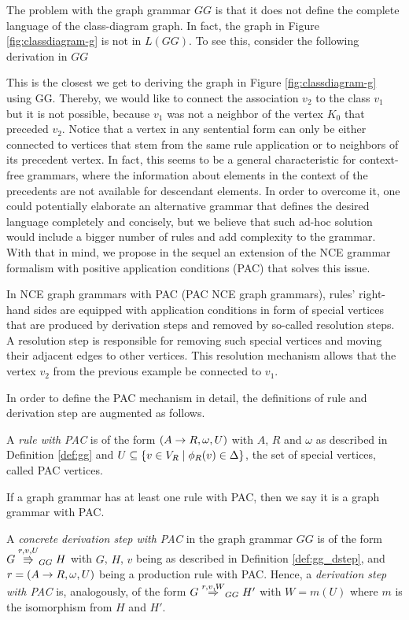 The problem with the graph grammar $GG$ is that it does not define the complete language of the class-diagram graph. In fact, the graph in Figure \ref{fig:classdiagram-g} is not in $L(GG)$. To see this, consider the following derivation in $GG$
%


This is the closest we get to deriving the graph in Figure \ref{fig:classdiagram-g} using GG. Thereby, we would like to connect the association $v_2$ to the class $v_1$ but it is not possible, because $v_1$ was not a neighbor of the vertex $K_0$ that preceded $v_2$. Notice that a vertex in any sentential form can only be either connected to vertices that stem from the same rule application or to neighbors of its precedent vertex. In fact, this seems to be a general characteristic for context-free grammars, where the information about elements in the context of the precedents are not available for descendant elements. In order to overcome it, one could potentially elaborate an alternative grammar that defines the desired language completely and concisely, but we believe that such ad-hoc solution would include a bigger number of rules and add complexity to the grammar. With that in mind, we propose in the sequel an extension of the NCE grammar formalism with positive application conditions (PAC) that solves this issue. 

In NCE graph grammars with PAC (PAC NCE graph grammars), rules' right-hand sides are equipped with application conditions in form of special vertices that are produced by derivation steps and removed by so-called resolution steps. A resolution step is responsible for removing such special vertices and moving their adjacent edges to other vertices. This resolution mechanism allows that the vertex $v_2$ from the previous example be connected to $v_1$. 

In order to define the PAC mechanism in detail, the definitions of rule and derivation step are augmented as follows.

\begin{definition}
	A \emph{rule with PAC} is of the form $(A \to R, \omega, U)$ with $A$, $R$ and $\omega$ as described in Definition \ref{def:gg} and $U \subseteq \{v \in V_R \; | \; \phi_R(v) \in \Delta\}$, the set of special vertices, called PAC vertices.
\end{definition}

If a graph grammar has at least one rule with PAC, then we say it is a graph grammar with PAC.

\begin{definition}
	A \textit{concrete derivation step with PAC} in the graph grammar $GG$ is of the form $G \overset{r,v,U}{\Rrightarrow}_{GG} H$ with $G$, $H$, $v$ being as described in Definition \ref{def:gg_dstep}, and $r = (A \to R, \omega, U)$ being a production rule with PAC. Hence, a \textit{derivation step with PAC} is, analogously, of the form $G \derivpac{r}{v}{W}{GG} H'$ with $W = m(U)$ where $m$ is the isomorphism from $H$ and $H'$.
\end{definition}

